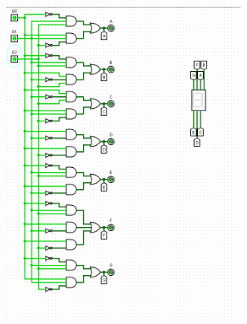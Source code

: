 \documentclass[]{article}
\begin{document}
\begin{figure}[H]
	\centering
	\includegraphics[width=0.7\textwidth]{DWA_111.png}
\end{figure}
\end{document}
